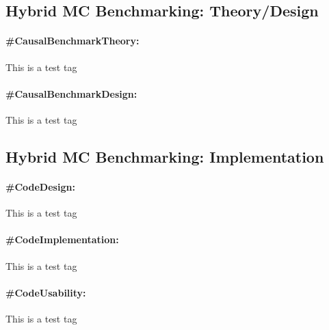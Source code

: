 \documentclass[./main.tex]{subfiles}
\begin{document}
\subsection{Hybrid MC Benchmarking: Theory/Design}
\paragraph*{\textbf{\#CausalBenchmarkTheory:}}\label{lo:CausalBenchmarkTheory} This is a test tag
\paragraph*{\textbf{\#CausalBenchmarkDesign:}}\label{lo:CausalBenchmarkDesign} This is a test tag

\subsection{Hybrid MC Benchmarking: Implementation}
\paragraph*{\textbf{\#CodeDesign:}}\label{lo:CodeDesign} This is a test tag
\paragraph*{\textbf{\#CodeImplementation:}}\label{lo:CodeImplementation} This is a test tag
\paragraph*{\textbf{\#CodeUsability:}}\label{lo:CodeUsability} This is a test tag
\end{document}
